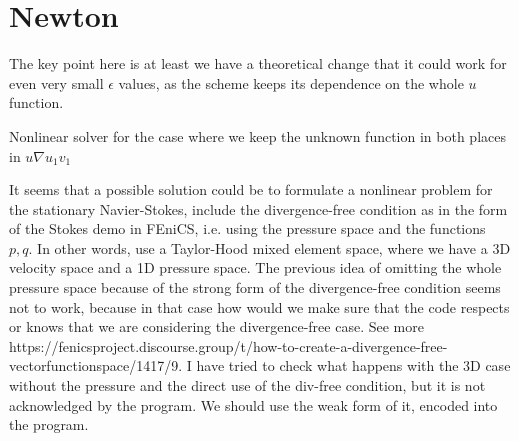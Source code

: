 \documentclass[11pt]{article}
\begin{document}
\section{Newton}

The key point here is at least we have a theoretical change that it could work for even very small $\epsilon$ values, as the scheme keeps its dependence on the whole $u$ function.

Nonlinear solver for the case where we keep the unknown function in both places in $u \nabla u_1 v_1$

It seems that a possible solution could be to formulate a nonlinear problem for the stationary Navier-Stokes, include the divergence-free condition as in the form of the Stokes demo in FEniCS, i.e. using the pressure space and the functions $p,q.$ In other words, use a Taylor-Hood mixed element space, where we have a 3D velocity space and a 1D pressure space. The previous idea of omitting the whole pressure space because of the strong form of the divergence-free condition seems not to work, because in that case how would we make sure that the code respects or knows that we are considering the divergence-free case. See more https://fenicsproject.discourse.group/t/how-to-create-a-divergence-free-vectorfunctionspace/1417/9.
I have tried to check what happens with the 3D case without the pressure and the direct use of the div-free condition, but it is not acknowledged by the program. We should use the weak form of it, encoded into the program.
\end{document}
